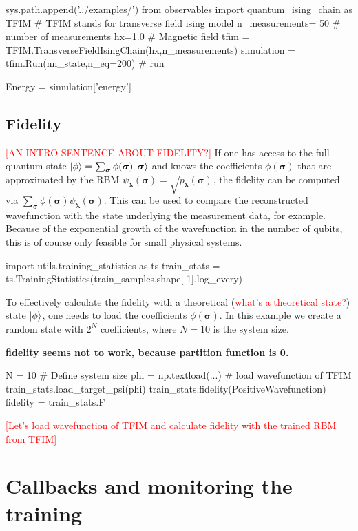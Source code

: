 \documentclass[submission, Phys]{SciPost}
\begin{document}
\begin{python}
sys.path.append('../examples/')
from observables import quantum_ising_chain as TFIM
# TFIM stands for transverse field ising model
n_measurements= 50 # number of measurements
hx=1.0             # Magnetic field
tfim = TFIM.TransverseFieldIsingChain(hx,n_measurements)
simulation = tfim.Run(nn_state,n_eq=200) # run 

Energy = simulation['energy']
\end{python}

\subsection{Fidelity}
\textcolor{red}{[AN INTRO SENTENCE ABOUT FIDELITY?]}
If one has access to the full quantum state $\ket{\phi} = \sum_{\bm{\sigma}} \phi(\bm{\sigma}) \ket{ \bm{\sigma}}$ 
and knows the coefficients $\phi(\bm{\sigma})$ that are approximated by the RBM 
$\psi_{\bm{\lambda}}(\bm{\sigma}) = \sqrt{p_{\bm{\lambda}}(\bm{\sigma})}$, 
the fidelity can be computed via $\sum_{\bm{\sigma}} \phi(\bm{\sigma}) \psi_{\bm{\lambda}}(\bm{\sigma})$. 
This can be used to compare the reconstructed wavefunction with the state underlying the measurement data, for example.
Because of the exponential growth of the wavefunction in the number of qubits, this is of course only feasible for small physical systems.
\begin{python}
import utils.training_statistics as ts
train_stats = ts.TrainingStatistics(train_samples.shape[-1],log_every)
\end{python}
%
To effectively calculate the fidelity with a theoretical (\textcolor{red}{what's a theoretical state?}) state $\ket{\phi}$, one needs to load the coefficients $\phi(\bm{\sigma})$. In this example we create a random state with $2^N$ coefficients, where $N=10$ is the system size.

\textbf{fidelity seems not to work, because partition function is 0.}

\begin{python}
N = 10 # Define system size
phi =  np.textload(...) # load wavefunction of TFIM
train_stats.load_target_psi(phi)
train_stats.fidelity(PositiveWavefunction)
fidelity = train_stats.F
\end{python}

\textcolor{red}{[Let's load wavefunction of TFIM and calculate fidelity with the trained RBM from TFIM]}

\section{Callbacks and monitoring the training}
\label{Sec:Callbacks}
\end{document}

